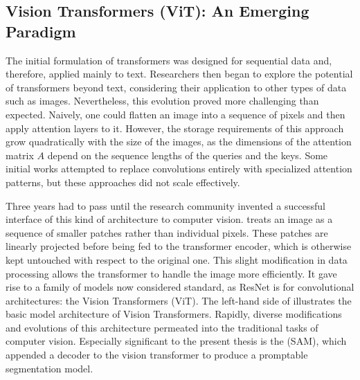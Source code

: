 \subsection{Vision Transformers (ViT): An Emerging Paradigm}
The initial formulation of transformers was designed for sequential data and, therefore, applied mainly to text. Researchers then began to explore the potential of transformers beyond text, considering their application to other types of data such as images. Nevertheless, this evolution proved more challenging than expected. Naively, one could flatten an image into a sequence of pixels and then apply attention layers to it. However, the storage requirements of this approach grow quadratically with the size of the images, as the dimensions of the attention matrix $A$ depend on the sequence lengths of the queries and the keys. Some initial works attempted to replace convolutions entirely with specialized attention patterns, but these approaches did not scale effectively.


Three years had to pass until the research community invented a successful interface of this kind of architecture to computer vision.  treats an image as a sequence of smaller patches rather than individual pixels. These patches are linearly projected before being fed to the transformer encoder, which is otherwise kept untouched with respect to the original one. This slight modification in data processing allows the transformer to handle the image more efficiently. It gave rise to a family of models now considered standard, as ResNet is for convolutional architectures: the Vision Transformers (ViT). The left-hand side of  illustrates the basic model architecture of Vision Transformers. Rapidly, diverse modifications and evolutions of this architecture permeated into the traditional tasks of computer vision. Especially significant to the present thesis is the  (SAM), which appended a decoder to the vision transformer to produce a promptable segmentation model. 

